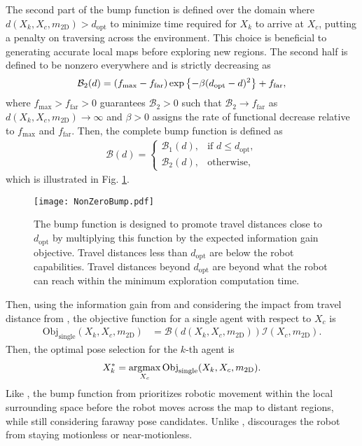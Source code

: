 The second part of the bump function is defined over the domain where \\$d(X_k,X_c,m_\text{2D})>d_\text{opt}$ to minimize time required for $X_k$ to arrive at $X_c$, putting a penalty on traversing across the environment. This choice is beneficial to generating accurate local maps before exploring new regions. The second half is defined to be nonzero everywhere and is strictly decreasing as 
\begin{align}
\label{eqn:BumpFunDecreasing}
\mathcal B_2(d)=(f_\text{max}-f_\text{far})\exp\left\{ -\beta(d_\text{opt}-d)^2 \right\}+f_\text{far},
\end{align}
where $f_\text{max}>f_\text{far}>0$ guarantees $\mathcal B_2>0$ such that $\mathcal B_2\rightarrow f_\text{far}$ as $d(X_k,X_c,m_\text{2D})\rightarrow\infty$ and $\beta>0$ assigns the rate of functional decrease relative to $f_\text{max}$ and $f_\text{far}$. Then, the complete bump function is defined as
\begin{align}
\label{eqn:BumpFun}
\mathcal B(d)=
\begin{cases}
    \mathcal B_1(d),		& \text{if }d\leq d_\text{opt},\\
    \mathcal B_2(d),         & \text{otherwise},
\end{cases}
\end{align}
which is illustrated in Fig. \ref{fig:nonzeroBumpFun}. %

	\begin{figure}
		\centerline{
			\texttt{[image: NonZeroBump.pdf]}
		}
		\caption{The bump function is designed to promote travel distances close to $d_\text{opt}$ by multiplying this function by the expected information gain objective. Travel distances less than $d_\text{opt}$ are below the robot capabilities. Travel distances beyond $d_\text{opt}$ are beyond what the robot can reach within the minimum exploration computation time.}
		\label{fig:nonzeroBumpFun}
	\end{figure}
	
Then, using the information gain from  and considering the impact from travel distance from , the objective function for a single agent with respect to $X_{c}$ is
\begin{align}
\label{eqn:CandidateBidSingle}
\text{Obj}_\text{single}(X_k,X_c,m_\text{2D})&=\mathcal B(d(X_k,X_c,m_\text{2D}))\mathcal I(X_{c},m_\text{2D}).
\end{align}
Then, the optimal pose selection for the $k$-th agent is
\begin{align}
\label{eqn:OptPoseSingle}
X^*_{k}=\argmax_{X_c}\text{Obj}_\text{single}(X_k,X_c,m_\text{2D}).
\end{align}
Like , the bump function from  prioritizes robotic movement within the local surrounding space before the robot moves across the map to distant regions, while still considering faraway pose candidates. Unlike ,  discourages the robot from staying motionless or near-motionless.

